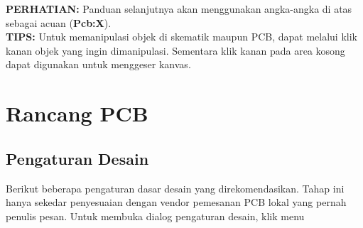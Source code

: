 \documentclass[12pt]{book}
\begin{document}
	\textbf{PERHATIAN:} Panduan selanjutnya akan menggunakan angka-angka di atas sebagai acuan (\textbf{Pcb:X}).\\

	\textbf{TIPS:} Untuk memanipulasi objek di skematik maupun PCB, dapat melalui klik kanan objek yang ingin dimanipulasi.
	Sementara klik kanan pada area kosong dapat digunakan untuk menggeser kanvas.

	\newpage
	\section{Rancang PCB}

	\subsection{Pengaturan Desain}

	Berikut beberapa pengaturan dasar desain yang direkomendasikan.
	Tahap ini hanya sekedar penyesuaian dengan vendor pemesanan PCB lokal yang pernah penulis pesan.
	Untuk membuka dialog pengaturan desain, klik menu 
\end{document}
